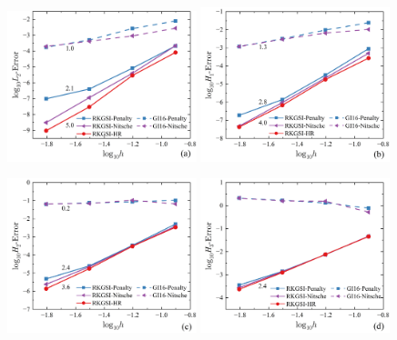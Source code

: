 \begin{figure}[H]
    \centering
    \begin{subcaptiongroup}
    \includegraphics[width=0.49\textwidth]{figure/PHR/A/QL2.png}
    \label{AQL2}
    \includegraphics[width=0.49\textwidth]{figure/PHR/A/QH1.png}
    \label{AQH1}
    \end{subcaptiongroup}
    \begin{subcaptiongroup}
    \includegraphics[width=0.49\textwidth]{figure/PHR/A/QH2.png}
    \label{AQH2}
    \includegraphics[width=0.49\textwidth]{figure/PHR/A/QH3.png}
    \label{AQH3}
    \end{subcaptiongroup}
\caption{}
\label{AQLH}
\end{figure}
